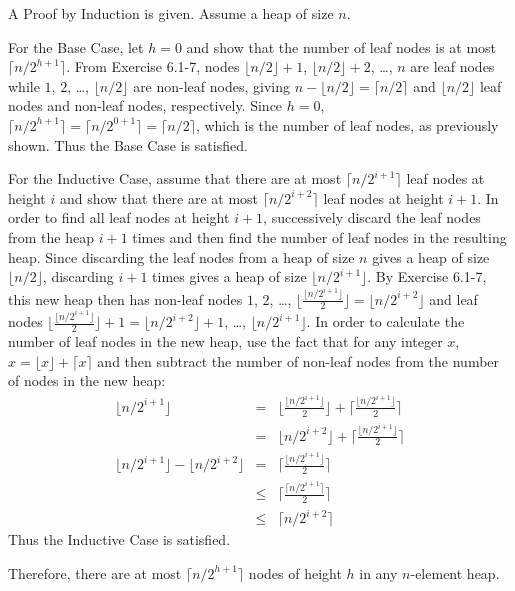 A Proof by Induction is given. Assume a heap of size $n$.

For the Base Case, let $h = 0$ and show that the number of leaf nodes is at most $\lceil n / 2^{h+1} \rceil$. From Exercise 6.1-7, nodes $\lfloor n / 2 \rfloor + 1$, $\lfloor n / 2 \rfloor + 2$, \ldots, $n$ are leaf nodes while $1$, $2$, \ldots, $\lfloor n / 2 \rfloor$ are non-leaf nodes, giving $n - \lfloor n / 2 \rfloor = \lceil n / 2 \rceil$ and $\lfloor n / 2 \rfloor$ leaf nodes and non-leaf nodes, respectively. Since $h = 0$, $\lceil n / 2^{h+1} \rceil = \lceil n / 2^{0+1} \rceil = \lceil n / 2 \rceil$, which is the number of leaf nodes, as previously shown. Thus the Base Case is satisfied.

For the Inductive Case, assume that there are at most $\lceil n / 2^{i+1} \rceil$ leaf nodes at height $i$ and show that there are at most $\lceil n / 2^{i+2} \rceil$ leaf nodes at height $i + 1$. In order to find all leaf nodes at height $i + 1$, successively discard the leaf nodes from the heap $i+1$ times and then find the number of leaf nodes in the resulting heap. Since discarding the leaf nodes from a heap of size $n$ gives a heap of size $\lfloor n / 2 \rfloor$, discarding $i + 1$ times gives a heap of size $\lfloor n / 2^{i+1} \rfloor$. By Exercise 6.1-7, this new heap then has non-leaf nodes $1$, $2$, \ldots, $\lfloor \frac{\lfloor n / 2^{i+1} \rfloor}{2} \rfloor = \lfloor n / 2^{i+2} \rfloor$ and leaf nodes $\lfloor \frac{\lfloor n / 2^{i+1} \rfloor}{2} \rfloor + 1 = \lfloor n / 2^{i+2} \rfloor + 1$, \ldots, $\lfloor n / 2^{i+1} \rfloor$. In order to calculate the number of leaf nodes in the new heap, use the fact that for any integer $x$, $x = \lfloor x \rfloor + \lceil x \rceil$ and then subtract the number of non-leaf nodes from the number of nodes in the new heap:
\begin{eqnarray*}
	\lfloor n / 2^{i+1} \rfloor & = & \lfloor \frac{\lfloor n / 2^{i+1} \rfloor}{2} \rfloor + \lceil \frac{\lfloor n / 2^{i+1} \rfloor}{2} \rceil \\
	& = & \lfloor n / 2^{i+2} \rfloor + \lceil \frac{ \lfloor n / 2^{i+1} \rfloor}{2} \rceil \\
	\lfloor n / 2^{i+1} \rfloor - \lfloor n / 2^{i+2} \rfloor & = & \lceil \frac{\lfloor n / 2^{i+1} \rfloor}{2} \rceil \\
	& \leq & \lceil \frac{\lceil n / 2^{i+1} \rceil}{2} \rceil \\
	& \leq & \lceil n / 2^{i+2} \rceil
\end{eqnarray*}
Thus the Inductive Case is satisfied.

Therefore, there are at most $\lceil n / 2^{h+1} \rceil$ nodes of height $h$ in any $n$-element heap.
